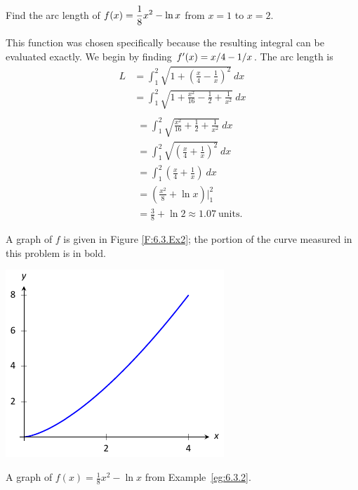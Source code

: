 \begin{example} \label{eg:6.3.2} %
Find the arc length of $\displaystyle f(x) =\frac18x^2-\ln x$ from $x=1$ to $x=2$.

\solution
This function was chosen specifically because the resulting integral can be evaluated exactly. We begin by finding $f'(x) = x/4-1/x$. The arc length is 
\begin{align*}
L		&=  \int_1^2 \sqrt{1+ \left(\frac x4-\frac1x\right)^2}\ dx \\
		&= 	\int_1^2 \sqrt{1 + \frac{x^2}{16} -\frac12 + \frac1{x^2} } \ dx \\
\end{align*}
\begin{align*}
\phantom{L}
		&=	\int_1^2 \sqrt{\frac{x^2}{16} +\frac12 + \frac1{x^2} } \ dx \\
		&=	\int_1^2	\sqrt{ \left(\frac x4 + \frac1x\right)^2}\ dx \\
		&= \int_1^2 \left(\frac x4 + \frac1x\right) \ dx \\
		&=  \left(\frac{x^2}8 + \ln x\right)\Bigg|_1^2\\
		&=	\frac38+\ln 2 \approx 1.07 \ \text{units}.
\end{align*}
	
A graph of $f$ is given in Figure \ref{F:6.3.Ex2}; the portion of the curve measured in this problem is in bold.

\end{example}

\begin{marginfigure}[-8cm] %
\includegraphics{figures/figarc1}
\caption{A graph of $f(x) = \frac18x^2-\ln x$ from Example~\ref{eg:6.3.2}.} \label{F:6.3.Ex2}
\end{marginfigure}

